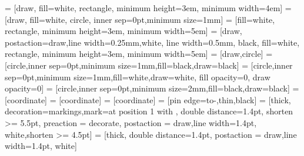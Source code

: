  = [draw, fill=white, rectangle, minimum height=3em, minimum width=4em]
 = [draw, fill=white, circle, inner sep=0pt,minimum size=1mm]
 = [fill=white, rectangle, minimum height=3em, minimum width=5em]
 = [draw, postaction={draw,line width=0.25mm,white}, line width=0.5mm, black, fill=white, rectangle, minimum height=3em, minimum width=5em]
 = [draw,circle]
 = [circle,inner sep=0pt,minimum size=1mm,fill=black,draw=black]
 = [circle,inner sep=0pt,minimum size=1mm,fill=white,draw=white, fill opacity=0, draw opacity=0]
 = [circle,inner sep=0pt,minimum size=2mm,fill=black,draw=black]
 = [coordinate]
 = [coordinate] 
 = [coordinate] 
 = [pin edge={to-,thin,black}] 
 = [thick, decoration={markings,mark=at position
   1 with {}},
   double distance=1.4pt, shorten >= 5.5pt,
   preaction = {decorate},
   postaction = {draw,line width=1.4pt, white,shorten >= 4.5pt}]
 = [thick,
   double distance=1.4pt,
   postaction = {draw,line width=1.4pt, white}]
